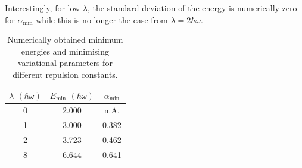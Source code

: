 \documentclass[a4paper,DIV=12,english]{scrartcl}
\begin{document}
Interestingly, for low $\lambda$, the standard deviation of the energy is numerically zero for $\alpha_\text{min}$ while this is no longer the case from $\lambda=2\hbar\omega$.

\begin{table}
    \centering
    \caption{Numerically obtained minimum energies and minimising variational parameters for different repulsion constants.}
    \vspace{0.25cm}
    \begin{tabular}{c|c|c}
        $\lambda$ $(\hbar\omega)$ & $E_\text{min}$ $(\hbar\omega)$ & $\alpha_\text{min}$\\
        \hline
        0 & 2.000 & n.A. \\
        1 & 3.000 & 0.382\\
        2 & 3.723 & 0.462 \\
        8 & 6.644 & 0.641 \\
    \end{tabular}
    \label{tab:results}
\end{table}
\end{document}
